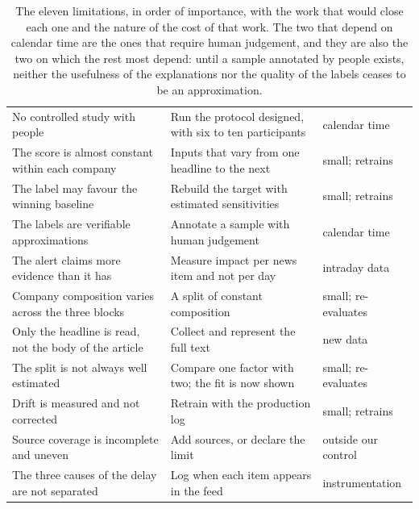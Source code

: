 \begin{table}[!htbp]
\caption[The limitations and the work that would close them]{The eleven limitations, in order of
importance, with the work that would close each one and the nature of the cost of that work. The
two that depend on calendar time are the ones that require human judgement, and they are also the
two on which the rest most depend: until a sample annotated by people exists, neither the
usefulness of the explanations nor the quality of the labels ceases to be an approximation.}
\label{tab:con_limites}
\centering
\footnotesize
\begin{tabular}{@{}L{0.33\textwidth} L{0.32\textwidth} L{0.20\textwidth}@{}}
\toprule
{} &  &  \\
\midrule
No controlled study with people & Run the protocol designed, with six to ten participants &
calendar time \\
The score is almost constant within each company & Inputs that vary from one headline to the next &
small; retrains \\
The label may favour the winning baseline & Rebuild the target with estimated sensitivities &
small; retrains \\
The labels are verifiable approximations & Annotate a sample with human judgement &
calendar time \\
The alert claims more evidence than it has & Measure impact per news item and not per day &
intraday data \\
Company composition varies across the three blocks & A split of constant composition & small; re-evaluates \\
Only the headline is read, not the body of the article & Collect and represent the full text &
new data \\
The split is not always well estimated & Compare one factor with two; the fit is now shown & small; re-evaluates \\
Drift is measured and not corrected & Retrain with the production log & small; retrains \\
Source coverage is incomplete and uneven & Add sources, or declare the limit &
outside our control \\
The three causes of the delay are not separated & Log when each item appears in the feed &
instrumentation \\
\bottomrule
\end{tabular}
\end{table}

